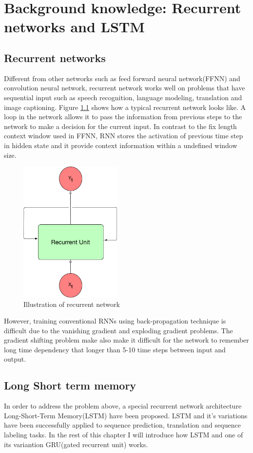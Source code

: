 \chapter{Background knowledge: Recurrent networks and LSTM}
	\label{CH_02}

\section{Recurrent networks}
Different from other networks such as feed forward neural network(FFNN) and convolution neural network, recurrent network works well on problems that have sequential input such as speech recognition, language modeling, translation and image captioning. Figure \ref{fig:0} shows how a typical recurrent network looks like. A loop in the network allows it to pass the information from previous steps to the network to make a decision for the current input. In contrast to the fix length context window used in FFNN, RNN stores the activation of previous time step in hidden state and it provide context information within a undefined window size.

\begin{figure}[h] 
	\centering
	\includegraphics[width=2.0in]{Figures/recurrent1}
	\caption[recurrent network]{Illustration of recurrent network}
	\label{fig:0}
\end{figure}

However, training conventional RNNs using back-propagation technique is difficult due to the vanishing gradient and exploding gradient problems\cite{bengio1994learning}. The gradient shifting problem make
also make it difficult for the network to remember long time dependency that longer than 5-10 time steps between input and output.
\section{Long Short term memory}
In order to address the problem above, a special recurrent network architecture Long-Short-Term Memory(LSTM) have been proposed\cite{hochreiter1997long}. LSTM and it's variations have been successfully applied to sequence prediction, translation and sequence labeling tasks. In the rest of this chapter I will introduce how LSTM and one of its variantion GRU(gated recurrent unit) works.\par

